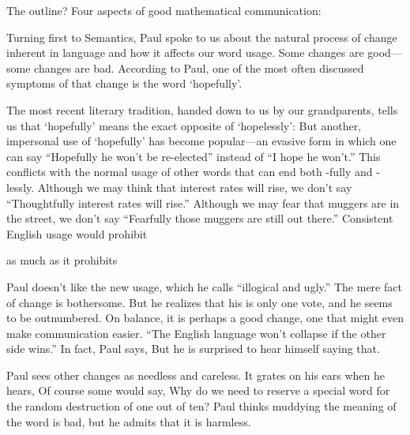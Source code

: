 The outline? Four aspects of good mathematical communication:

\nobreak\smallskip
{}

Turning first to Semantics, Paul spoke to us about the natural process of
change
inherent in language and how it affects our word usage.  Some changes
are good---some changes are bad.  According to Paul, one of the most often
discussed symptoms of that change is the word `hopefully'.

The most recent literary tradition, handed down to us by our
grandparents, tells us that
`hopefully' means the exact opposite of `hopelessly':
\nobreak\smallskip
{}
But another, impersonal use of `hopefully' has become popular---an evasive
form in which one can say ``Hopefully he won't be re-elected'' instead
of ``I hope he won't.'' This conflicts with the normal usage of other words that
can end both -fully and -lessly. Although we may
think that interest rates will rise, we don't say ``Thoughtfully interest
rates will rise.'' Although we may fear that muggers are in the street,
we don't say ``Fearfully those muggers are still out there.'' Consistent
English usage would prohibit

\nobreak\smallskip
{}
as much as it prohibits

\nobreak\smallskip
{}

Paul doesn't like the new usage, which he calls ``illogical and ugly.''
The mere fact of change is bothersome.
But he realizes that
his is only one vote, and he seems
to be outnumbered.  On  balance, it is perhaps a good change, one that
might even make communication easier. ``The English language won't
collapse if the other side wins.'' In fact, Paul says,
\nobreak\smallskip
{}
But he is surprised to hear himself saying that.

Paul sees other changes as needless and careless.
 It grates on his ears when he hears,
\nobreak\smallskip
{}
Of course some would say, Why do we need to reserve
 a special word for the random destruction of one out of
ten? Paul thinks muddying the meaning of the word is bad, but he admits
that it is harmless.

